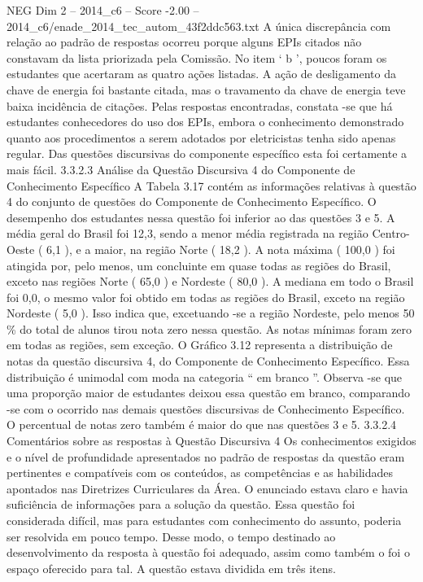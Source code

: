\begin{textsample}{NEG Dim 2 – 2014\_c6 – Score -2.00 – 2014\_c6/enade\_2014\_tec\_autom\_43f2ddc563.txt}
A única discrepância com relação ao padrão de respostas ocorreu porque alguns EPIs citados não constavam da lista priorizada pela Comissão.
No item ‘ b ’, poucos foram os estudantes que acertaram as quatro ações listadas.
A ação de desligamento da chave de energia foi bastante citada, mas o travamento da chave de energia teve baixa incidência de citações.
Pelas respostas encontradas, constata -se que há estudantes conhecedores do uso dos EPIs, embora o conhecimento demonstrado quanto aos procedimentos a serem adotados por eletricistas tenha sido apenas regular.
Das questões discursivas do componente específico esta foi certamente a mais fácil. 3.3.2.3 Análise da Questão Discursiva 4 do Componente de Conhecimento Específico A Tabela 3.17 contém as informações relativas à questão 4 do conjunto de questões do Componente de Conhecimento Específico.
O desempenho dos estudantes nessa questão foi inferior ao das questões 3 e 5.
A média geral do Brasil foi 12,3, sendo a menor média registrada na região Centro-Oeste ( 6,1 ), e a maior, na região Norte ( 18,2 ).
A nota máxima ( 100,0 ) foi atingida por, pelo menos, um concluinte em quase todas as regiões do Brasil, exceto nas regiões Norte ( 65,0 ) e Nordeste ( 80,0 ).
A mediana em todo o Brasil foi 0,0, o mesmo valor foi obtido em todas as regiões do Brasil, exceto na região Nordeste ( 5,0 ).
Isso indica que, excetuando -se a região Nordeste, pelo menos 50 \% do total de alunos tirou nota zero nessa questão.
As notas mínimas foram zero em todas as regiões, sem exceção.
O Gráfico 3.12 representa a distribuição de notas da questão discursiva 4, do Componente de Conhecimento Específico.
Essa distribuição é unimodal com moda na categoria “ em branco ”.
Observa -se que uma proporção maior de estudantes deixou essa questão em branco, comparando -se com o ocorrido nas demais questões discursivas de Conhecimento Específico.
O percentual de notas zero também é maior do que nas questões 3 e 5. 3.3.2.4 Comentários sobre as respostas à Questão Discursiva 4 Os conhecimentos exigidos e o nível de profundidade apresentados no padrão de respostas da questão eram pertinentes e compatíveis com os conteúdos, as competências e as habilidades apontados nas Diretrizes Curriculares da Área.
O enunciado estava claro e havia suficiência de informações para a solução da questão.
Essa questão foi considerada difícil, mas para estudantes com conhecimento do assunto, poderia ser resolvida em pouco tempo.
Desse modo, o tempo destinado ao desenvolvimento da resposta à questão foi adequado, assim como também o foi o espaço oferecido para tal.
A questão estava dividida em três itens.

\end{textsample}
